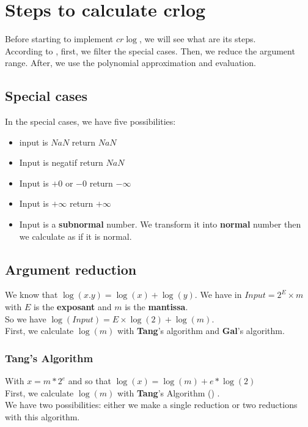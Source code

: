 \chapter{Steps to calculate crlog}
Before starting to implement $cr\log$, we will see what are its 
steps.\\
According to \cite{le2016computing}, first, we filter the special cases. Then, we
 reduce the argument range. After, we use the polynomial approximation and 
 evaluation.

\section{Special cases}
In the special cases, we have five possibilities:
\begin{itemize}
    \item input is $NaN$ return $NaN$
    \item Input is negatif return $NaN$
    \item Input is $+0$ or $-0$ return $-\infty$
    \item Input is $+\infty$ return $+\infty$
    \item Input is a \textbf{subnormal} number. We transform it into \textbf{normal} number then we calculate as if it is normal.
\end{itemize}

\section{Argument reduction}
We know that $\log(x.y) = \log(x) + \log(y)$. 
We have in $Input = 2^E \times m$ with $E$ is the \textbf{exposant} and $m$ is the \textbf{mantissa}.\\
So we have $\log(Input) = E \times \log(2) + \log(m)$. \\
First, we calculate $\log(m)$ with \textbf{Tang}'s algorithm and \textbf{Gal}'s algorithm.

\subsection{ \textbf{Tang}'s Algorithm} \label{subsection:Tang}
With $x=m*2^e$ and so that $\log(x) = \log(m) +e*\log(2)$\\
First, we  calculate $\log(m)$ with \textbf{Tang}'s Algorithm (\cite{le2016computing}) .\\
We have  two possibilities: either we make a single reduction or two reductions with this algorithm.\\

